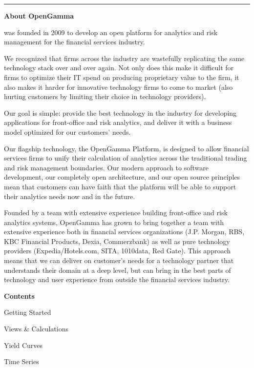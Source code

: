 \documentclass[custom, plainsections]{sciposter}
\begin{document}
\begin{multicols*}{3}
\vspace{0.5cm}
\hrule
\vspace{0.5cm}

\textbf{About OpenGamma}

 was founded in 2009 to develop an open platform for analytics and risk management for the financial services industry.

We recognized that firms across the industry are wastefully replicating the same technology stack over and over again. Not only does this make it difficult for firms to optimize their IT spend on producing proprietary value to the firm, it also makes it harder for innovative technology firms to come to market (also hurting customers by limiting their choice in technology providers).

Our goal is simple: provide the best technology in the industry for developing applications for front-office and risk analytics, and deliver it with a business model optimized for our customers' needs.

Our flagship technology, the OpenGamma Platform, is designed to allow financial services firms to unify their calculation of analytics across the traditional trading and risk management boundaries. Our modern approach to software development, our completely open architecture, and our open source principles mean that customers can have faith that the platform will be able to support their analytics needs now and in the future.

Founded by a team with extensive experience building front-office and risk analytics systems, OpenGamma has grown to bring together a team with extensive experience both in financial services organizations (J.P. Morgan, RBS, KBC Financial Products, Dexia, Commerzbank) as well as pure technology providers (Expedia/Hotels.com, SITA, 1010data, Red Gate). This approach means that we can deliver on customer's needs for a technology partner that understands their domain at a deep level, but can bring in the best parts of technology and user experience from outside the financial services industry.

\vfill
\columnbreak

\textbf{Contents}

Getting Started \dotfill \pageref{sec:getting-started}

Views & Calculations  \dotfill \pageref{sec:views}

Yield Curves  \dotfill \pageref{sec:yield-curves}

Time Series \dotfill \pageref{sec:time-series}


\end{multicols*}
\end{document}

